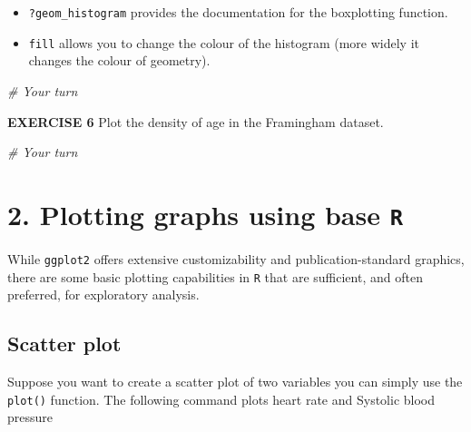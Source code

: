 \documentclass[
]{article}
\newenvironment{Shaded}{\begin{snugshade}}{\end{snugshade}}
\newcommand{\CommentTok}[1]{\textcolor[rgb]{0.56,0.35,0.01}{\textit{#1}}}
\newcommand{\DataTypeTok}[1]{\textcolor[rgb]{0.13,0.29,0.53}{#1}}
\newcommand{\KeywordTok}[1]{\textcolor[rgb]{0.13,0.29,0.53}{\textbf{#1}}}
\newcommand{\NormalTok}[1]{#1}
\newcommand{\OperatorTok}[1]{\textcolor[rgb]{0.81,0.36,0.00}{\textbf{#1}}}
\newcommand{\StringTok}[1]{\textcolor[rgb]{0.31,0.60,0.02}{#1}}
\begin{document}
\begin{itemize}
\item
  \texttt{?geom\_histogram} provides the documentation for the
  boxplotting function.
\item
  \texttt{fill} allows you to change the colour of the histogram (more
  widely it changes the colour of geometry).
\end{itemize}

\begin{Shaded}
\begin{Highlighting}[]
\CommentTok{# Your turn}
\end{Highlighting}
\end{Shaded}

\textbf{EXERCISE 6} Plot the density of age in the Framingham dataset.

\begin{Shaded}
\begin{Highlighting}[]
\CommentTok{# Your turn}
\end{Highlighting}
\end{Shaded}

\hypertarget{plotting-graphs-using-base-r}{%
\section{\texorpdfstring{2. Plotting graphs using base
\texttt{R}}{2. Plotting graphs using base R}}\label{plotting-graphs-using-base-r}}

While \texttt{ggplot2} offers extensive customizability and
publication-standard graphics, there are some basic plotting
capabilities in \texttt{R} that are sufficient, and often preferred, for
exploratory analysis.

\hypertarget{scatter-plot}{%
\subsection{Scatter plot}\label{scatter-plot}}

Suppose you want to create a scatter plot of two variables you can
simply use the \texttt{plot()} function. The following command plots
heart rate and Systolic blood pressure

\begin{Shaded}
\end{Shaded}
\end{document}

